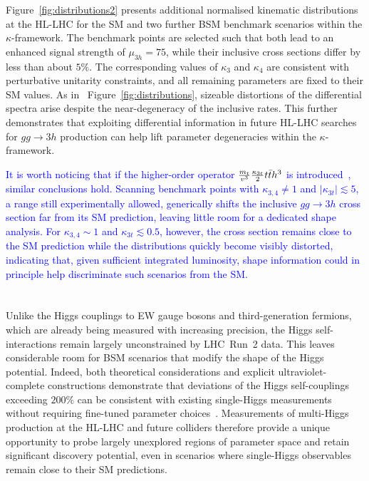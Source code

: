 \documentclass{SciPost}
\begin{document}
Figure~\ref{fig:distributions2} presents additional normalised kinematic distributions at the HL-LHC for the SM and two further BSM benchmark scenarios within the $\kappa$-framework. The benchmark points are selected such that both lead to an enhanced signal strength of $\mu_{3h}=75$, while their inclusive cross sections differ by less than about $5\%$. The corresponding values of $\kappa_3$ and $\kappa_4$ are consistent with perturbative unitarity constraints, and all remaining parameters are fixed to their SM values. As in ~Figure~\ref{fig:distributions}, sizeable distortions of the differential spectra arise despite the near-degeneracy of the inclusive rates. This further demonstrates that exploiting differential information in future HL-LHC searches for $gg \to 3h$ production can help lift parameter degeneracies within the $\kappa$-framework.

{\textcolor{blue}{It is worth noticing that if the higher-order operator ${m_t\over v^3} {\kappa_{3t}\over 2} t\bar t h^3$ is introduced~\cite{Papaefstathiou:2023uum}, similar conclusions hold. Scanning benchmark points with $\kappa_{3,4}\neq1$ and $|\kappa_{3t}|\lesssim 5$, a range still experimentally allowed, generically shifts the inclusive $gg \to 3h$ cross section far from its SM prediction, leaving little room for a dedicated shape analysis. For $\kappa_{3,4}\sim 1$ and $\kappa_{3t}\lesssim0.5$, however, the cross section remains close to the SM prediction while the distributions quickly become visibly distorted, indicating that, given sufficient integrated luminosity, shape information could in principle help discriminate such scenarios from the SM.}}

\section{\textbf{}}
\label{sec:conclusions}

Unlike the Higgs couplings to EW gauge bosons and third-generation fermions, which are already being measured with increasing precision, the Higgs self-interactions remain largely unconstrained by LHC~Run~2 data. This leaves considerable room for BSM scenarios that modify the shape of the Higgs potential. Indeed, both theoretical considerations and explicit ultraviolet-complete constructions demonstrate that deviations of the Higgs self-couplings exceeding $200\%$ can be consistent with existing single-Higgs measurements without requiring fine-tuned parameter choices~\cite{Durieux:2022hbu}. Measurements of multi-Higgs production at the HL-LHC and future colliders therefore provide a unique opportunity to probe largely unexplored regions of parameter space and retain significant discovery potential, even in scenarios where single-Higgs observables remain close to their SM predictions.
\end{document}
